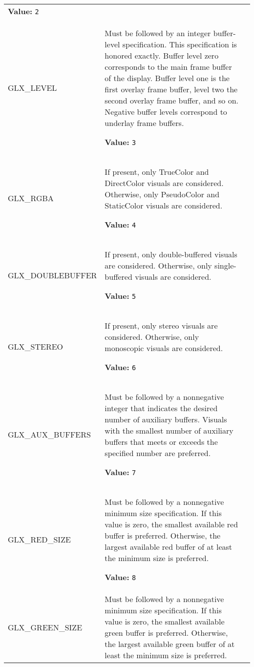 \begin{longtable}{|p{\varnamewidth}|p{\vardescrwidth}|l}
\textbf{Value:} 
{\tt 2}&\\
\cline{1-2}
\raggedright G\-L\-X\-\_\-L\-E\-V\-E\-L\- & \raggedright Must be followed by an integer buffer-level specification. This
specification is honored exactly. Buffer level zero corresponds to the main
frame buffer of the display. Buffer level one is the first overlay frame
buffer, level two the second overlay frame buffer, and so on. Negative
buffer levels correspond to underlay frame buffers.

\textbf{Value:} 
{\tt 3}&\\
\cline{1-2}
\raggedright G\-L\-X\-\_\-R\-G\-B\-A\- & \raggedright If present, only TrueColor and DirectColor visuals are considered.
Otherwise, only PseudoColor and StaticColor visuals are considered.

\textbf{Value:} 
{\tt 4}&\\
\cline{1-2}
\raggedright G\-L\-X\-\_\-D\-O\-U\-B\-L\-E\-B\-U\-F\-F\-E\-R\- & \raggedright If present, only double-buffered visuals are considered. Otherwise,
only single-buffered visuals are considered.

\textbf{Value:} 
{\tt 5}&\\
\cline{1-2}
\raggedright G\-L\-X\-\_\-S\-T\-E\-R\-E\-O\- & \raggedright If present, only stereo visuals are considered. Otherwise, only
monoscopic visuals are considered.

\textbf{Value:} 
{\tt 6}&\\
\cline{1-2}
\raggedright G\-L\-X\-\_\-A\-U\-X\-\_\-B\-U\-F\-F\-E\-R\-S\- & \raggedright Must be followed by a nonnegative integer that indicates the desired
number of auxiliary buffers. Visuals with the smallest number of auxiliary
buffers that meets or exceeds the specified number are preferred.

\textbf{Value:} 
{\tt 7}&\\
\cline{1-2}
\raggedright G\-L\-X\-\_\-R\-E\-D\-\_\-S\-I\-Z\-E\- & \raggedright Must be followed by a nonnegative minimum size specification. If this value
is zero, the smallest available red buffer is preferred. Otherwise, the
largest available red buffer of at least the minimum size is preferred.

\textbf{Value:} 
{\tt 8}&\\
\cline{1-2}
\raggedright G\-L\-X\-\_\-G\-R\-E\-E\-N\-\_\-S\-I\-Z\-E\- & \raggedright Must be followed by a nonnegative minimum size specification. If this value
is zero, the smallest available green buffer is preferred. Otherwise, the
largest available green buffer of at least the minimum size is preferred.


\end{longtable}
